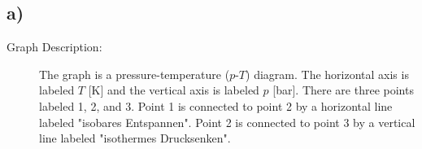 

\subsection*{a)}

\begin{description}
    \item[Graph Description:] The graph is a pressure-temperature ($p$-$T$) diagram. The horizontal axis is labeled $T$ [K] and the vertical axis is labeled $p$ [bar]. There are three points labeled 1, 2, and 3. Point 1 is connected to point 2 by a horizontal line labeled "isobares Entspannen". Point 2 is connected to point 3 by a vertical line labeled "isothermes Drucksenken".
\end{description}